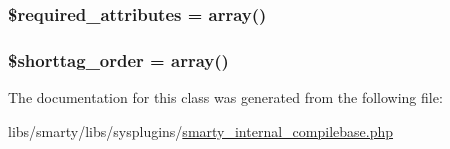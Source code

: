 \subsubsection[{\$required\+\_\+attributes}]{\setlength{\rightskip}{0pt plus 5cm}\$required\+\_\+attributes = array()}\label{class_smarty___internal___compile_base_ae799507d5461de485f3a618abeecea95}
\hypertarget{class_smarty___internal___compile_base_a2ccb25269c3a92e8c4796c7ef23725e6}{}
\subsubsection[{\$shorttag\+\_\+order}]{\setlength{\rightskip}{0pt plus 5cm}\$shorttag\+\_\+order = array()}\label{class_smarty___internal___compile_base_a2ccb25269c3a92e8c4796c7ef23725e6}


The documentation for this class was generated from the following file\+:\begin{DoxyCompactItemize}
\item 
libs/smarty/libs/sysplugins/\hyperlink{smarty__internal__compilebase_8php}{smarty\+\_\+internal\+\_\+compilebase.\+php}\end{DoxyCompactItemize}
